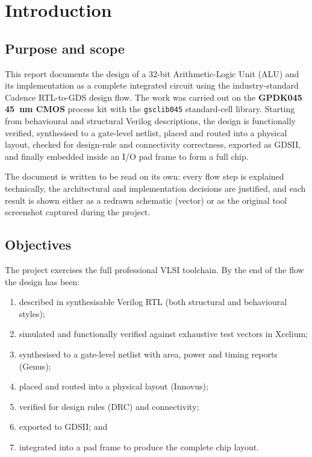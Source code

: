 \chapter{Introduction}
\label{ch:intro}

\section{Purpose and scope}
This report documents the design of a 32-bit Arithmetic-Logic Unit (ALU)
and its implementation as a complete integrated circuit using the
industry-standard Cadence RTL-to-GDS design flow. The work was carried
out on the \textbf{GPDK045 \SI{45}{\nano\meter} CMOS} process kit with the
\texttt{gsclib045} standard-cell library. Starting from behavioural and
structural Verilog descriptions, the design is functionally verified,
synthesised to a gate-level netlist, placed and routed into a physical
layout, checked for design-rule and connectivity correctness, exported as
GDSII, and finally embedded inside an I/O pad frame to form a full chip.

The document is written to be read on its own: every flow step is
explained technically, the architectural and implementation decisions are
justified, and each result is shown either as a redrawn schematic
(vector) or as the original tool screenshot captured during the project.

\section{Objectives}
The project exercises the full professional VLSI toolchain. By the end of
the flow the design has been:
\begin{enumerate}
  \item described in synthesisable Verilog RTL (both structural and
        behavioural styles);
  \item simulated and functionally verified against exhaustive test
        vectors in Xcelium;
  \item synthesised to a gate-level netlist with area, power and timing
        reports (Genus);
  \item placed and routed into a physical layout (Innovus);
  \item verified for design rules (DRC) and connectivity;
  \item exported to GDSII; and
  \item integrated into a pad frame to produce the complete chip layout.
\end{enumerate}

